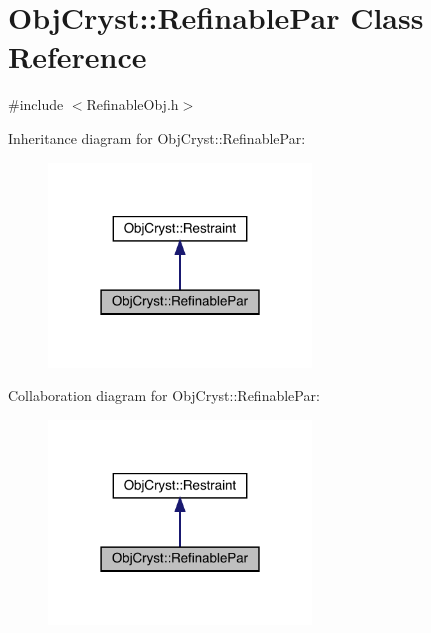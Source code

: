 \hypertarget{class_obj_cryst_1_1_refinable_par}{}\section{Obj\+Cryst\+::Refinable\+Par Class Reference}
\label{class_obj_cryst_1_1_refinable_par}


{\ttfamily \#include $<$Refinable\+Obj.\+h$>$}



Inheritance diagram for Obj\+Cryst\+::Refinable\+Par\+:
\nopagebreak
\begin{figure}[H]
\begin{center}
\leavevmode
\includegraphics[width=198pt]{class_obj_cryst_1_1_refinable_par__inherit__graph}
\end{center}
\end{figure}


Collaboration diagram for Obj\+Cryst\+::Refinable\+Par\+:
\nopagebreak
\begin{figure}[H]
\begin{center}
\leavevmode
\includegraphics[width=198pt]{class_obj_cryst_1_1_refinable_par__coll__graph}
\end{center}
\end{figure}
